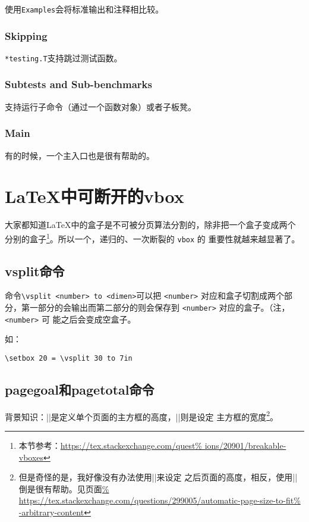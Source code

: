 使用\verb|Examples|会将标准输出和注释相比较。

\subsubsection{Skipping}

\verb|*testing.T|支持跳过测试函数。

\subsubsection{Subtests and Sub-benchmarks}

支持运行子命令（通过一个函数对象）或者子板凳。

\subsubsection{Main}

有的时候，一个主入口也是很有帮助的。


\section{\LaTeX{}中可断开的vbox}

大家都知道\LaTeX{}中的盒子是不可被分页算法分割的，除非把一个盒子变成两个
分别的盒子\footnote{本节参考：\url{https://tex.stackexchange.com/quest%
ions/20901/breakable-vboxes}}。所以一个，递归的、一次断裂的 \verb|vbox| 的
重要性就越来越显著了。

\subsection{vsplit命令}

\def\num{ \verb|<number>| }\def\dim{ \verb|<dimen>| }
命令\verb|\vsplit <number> to <dimen>|可以把\num 对应和盒子切割成两个部
分，第一部分的会输出而第二部分的则会保存到\num 对应的盒子。（注，\num 可
能之后会变成空盒子。

如：
\begin{lstlisting}
\setbox 20 = \vsplit 30 to 7in
\end{lstlisting}

\subsection{pagegoal和pagetotal命令}

背景知识：\ttva|\vsize|是定义单个页面的主方框的高度，\ttva|\hsize|则是设定
主方框的宽度\footnote{但是奇怪的是，我好像没有办法使用\ttva|\vsize|来设定
之后页面的高度，相反，使用\ttva|\pdfpageheigtht|倒是很有帮助。见页面\url{%
https://tex.stackexchange.com/questions/299005/automatic-page-size-to-fit%
-arbitrary-content}}。

